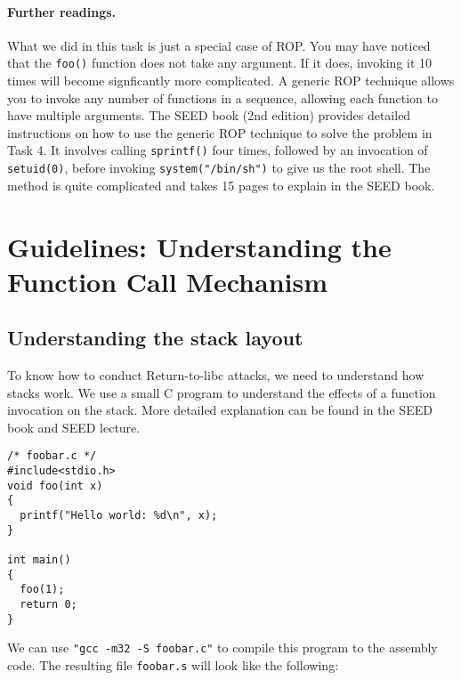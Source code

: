 \paragraph{Further readings.} What we did in this task is just a special case of ROP.
You may have noticed that the \texttt{foo()} function does not take any
argument. If it does, invoking it 10 times will become signficantly more 
complicated. A generic ROP technique allows you to invoke any number of functions
in a sequence, allowing each function to have multiple arguments. 
The SEED book (2nd edition) provides detailed instructions on how to 
use the generic ROP technique to solve the problem in Task 4. It involves 
calling \texttt{sprintf()} four times, followed by an invocation of 
\texttt{setuid(0)}, before invoking \texttt{system("/bin/sh")} to give 
us the root shell. The method is quite complicated and takes 15 pages 
to explain in the SEED book.



\section{Guidelines: Understanding the Function Call Mechanism}


\subsection{Understanding the stack layout}

To know how to conduct Return-to-libc attacks, we need to 
understand how stacks work.  We use a small C program to understand 
the effects of a function invocation on the stack. More detailed 
explanation can be found in the SEED book and SEED lecture. 


\begin{lstlisting}
/* foobar.c */
#include<stdio.h>
void foo(int x)
{
  printf("Hello world: %d\n", x);
}

int main()
{
  foo(1);
  return 0;
}
\end{lstlisting}

We can use {\tt "gcc -m32 -S foobar.c"} to
compile this program to the assembly code.
The resulting file {\tt foobar.s} will look like the following:


